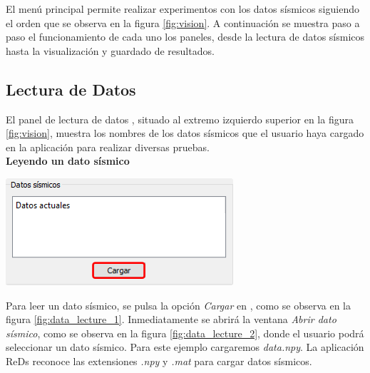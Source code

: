 \documentclass[12pt,twoside,letter]{ol-softwaremanual}
\newcommand*\circled[1]{\tikz[baseline=(char.base)]{
            \node[shape=circle,draw,inner sep=2pt] (char) {#1};}}
\newenvironment{Figure}
  {\par\medskip\noindent\minipage{\linewidth}}
  {\endminipage\par\medskip}
\begin{document}
El menú principal permite realizar experimentos con los datos sísmicos siguiendo el orden que se observa en la figura \ref{fig:vision}. A continuación se muestra paso a paso el funcionamiento de cada uno los paneles, desde la lectura de datos sísmicos hasta la visualización y guardado de resultados.

\subsection{Lectura de Datos}

El panel de lectura de datos \circled{2}, situado al extremo izquierdo superior en la figura \ref{fig:vision}, muestra los nombres de los datos sísmicos que el usuario haya cargado en la aplicación para realizar diversas pruebas.\\

\textbf{Leyendo un dato sísmico} \label{sec:data_lecture}

\begin{multicols}{2}
	
\begin{Figure}
	\centering
	\includegraphics[width=.9\linewidth]{data-lecture-1.png}
	\label{fig:data_lecture_1}
\end{Figure}

Para leer un dato sísmico, se pulsa la opción \emph{Cargar} en \circled{2}, como se observa en la figura \ref{fig:data_lecture_1}. Inmediatamente se abrirá la ventana \textit{Abrir dato sísmico}, como se observa en la figura \ref{fig:data_lecture_2}, donde el usuario podrá seleccionar un dato sísmico. Para este ejemplo cargaremos \emph{data.npy}.
La aplicación ReDs reconoce las extensiones \emph{.npy} y \emph{.mat} para cargar datos sísmicos.

\end{multicols}
\end{document}
